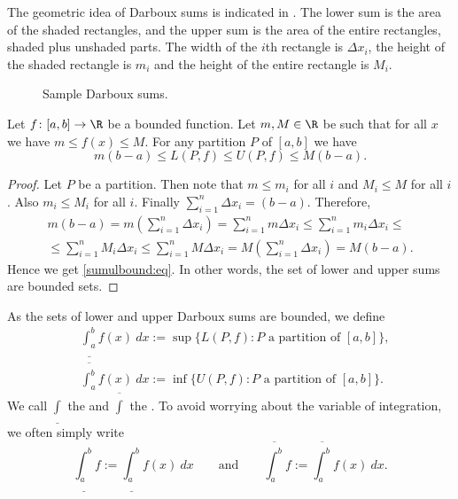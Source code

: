 \documentclass[12pt]{book}
\begin{document}
The geometric idea of Darboux sums is indicated in
.
The lower sum is the area of the shaded
rectangles, and the upper sum is the area of the entire
rectangles, shaded plus unshaded parts.
The width of the $i$th rectangle is $\Delta x_i$,
the height of the shaded rectangle is $m_i$ and the height
of the entire rectangle is $M_i$.

\begin{figure}[h!t]
\begin{center}

\caption{Sample Darboux sums.\label{darbouxfig}}
\end{center}
\end{figure}

\begin{prop} \label{sumulbound:prop}
Let $f \colon [a,b] \to \R$ be a bounded function.
Let $m, M \in \R$ be 
such that for all $x$ we have $m \leq f(x) \leq M$.
For any partition $P$ of $[a,b]$
we have
\begin{equation}
\label{sumulbound:eq}
m(b-a) \leq
L(P,f) \leq U(P,f)
\leq M(b-a) .
\end{equation}
\end{prop}

\begin{proof}
Let $P$ be a partition.
Then note that $m \leq m_i$ for all $i$ and
$M_i \leq M$ for all $i$.
Also $m_i \leq M_i$ for all $i$.
Finally
$\sum_{i=1}^n \Delta x_i = (b-a)$.
Therefore,
\begin{multline*}
m(b-a) =
m \left( \sum_{i=1}^n \Delta x_i \right)
=
\sum_{i=1}^n m \Delta x_i
\leq
\sum_{i=1}^n m_i \Delta x_i 
\leq
\\
\leq
\sum_{i=1}^n M_i \Delta x_i
\leq
\sum_{i=1}^n M \Delta x_i 
=
M \left( \sum_{i=1}^n \Delta x_i \right)
=
M(b-a) .
\end{multline*}
Hence we get \eqref{sumulbound:eq}.
In other words, the set of lower and
upper sums are bounded sets.
\end{proof}


\begin{defn}
As the sets of lower and upper Darboux sums are bounded, we define
\begin{align*}
& \underline{\int_a^b} f(x)~dx := \sup \{ L(P,f) : P \text{ a
partition of $[a,b]$} \} , \\
& \overline{\int_a^b} f(x)~dx := \inf \{ U(P,f) : P \text{ a
partition of $[a,b]$} \} .
\end{align*}
We call $\underline{\int}$ the \emph{} and
$\overline{\int}$ the \emph{}.
To avoid worrying about the variable of integration, 
we often simply write
\begin{equation*}
\underline{\int_a^b} f :=
\underline{\int_a^b} f(x)~dx 
\qquad \text{and} \qquad
\overline{\int_a^b} f :=
\overline{\int_a^b} f(x)~dx  .
\end{equation*}
\end{defn}
\end{document}
